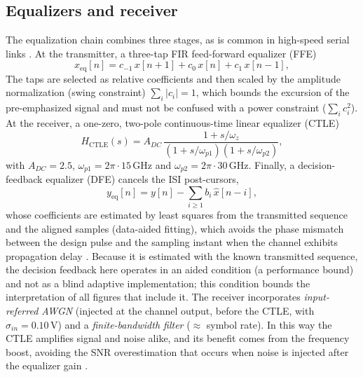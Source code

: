 \documentclass[twocolumn]{USG}
\begin{document}
\subsection{Equalizers and receiver}
The equalization chain combines three stages, as is common in high-speed
serial links \cite{10260232,10811094}. At the transmitter, a three-tap FIR
feed-forward equalizer (FFE)
\begin{equation}
x_{\mathrm{eq}}[n] = c_{-1}\,x[n{+}1] + c_{0}\,x[n] + c_{1}\,x[n{-}1],
\label{eq:ffe}
\end{equation}
The taps are selected as relative coefficients and then scaled by the
amplitude normalization (swing constraint) $\sum_i |c_i|=1$, which bounds
the excursion of the pre-emphasized signal and must not be confused with a
power constraint ($\sum_i c_i^2$). At the receiver, a one-zero,
two-pole continuous-time linear equalizer (CTLE) \cite{10873709}
\begin{equation}
H_{\mathrm{CTLE}}(s) = A_{DC}\,\frac{1+s/\omega_z}{(1+s/\omega_{p1})(1+s/\omega_{p2})},
\label{eq:ctle}
\end{equation}
with $A_{DC}=2.5$, $\omega_{p1}=2\pi\!\cdot\!15\,\mathrm{GHz}$ and
$\omega_{p2}=2\pi\!\cdot\!30\,\mathrm{GHz}$. Finally, a decision-feedback
equalizer (DFE) cancels the ISI post-cursors,
\begin{equation}
y_{\mathrm{eq}}[n] = y[n] - \sum_{i\ge 1} b_i\,\hat{x}[n{-}i],
\label{eq:dfe}
\end{equation}
whose coefficients are estimated by least squares from the transmitted
sequence and the aligned samples (data-aided fitting), which avoids the
phase mismatch between the design pulse and the sampling instant when the
channel exhibits propagation delay \cite{11346689}. Because it is estimated
with the known transmitted sequence, the decision feedback here operates in
an aided condition (a performance bound) and not as a blind adaptive
implementation; this condition bounds the interpretation of all figures that
include it. The receiver incorporates \emph{input-referred AWGN} (injected
at the channel output, before the CTLE, with
$\sigma_{in}=0.10\,\mathrm{V}$) and a \emph{finite-bandwidth filter}
($\approx$ symbol rate). In this way the CTLE amplifies signal and noise
alike, and its benefit comes from the frequency boost, avoiding the SNR
overestimation that occurs when noise is injected after the equalizer gain
\cite{9707817}.
\end{document}
